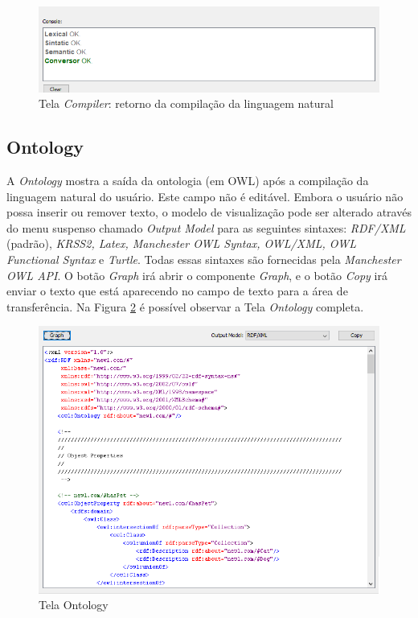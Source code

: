 \documentclass{bcc}
\begin{document}
\begin{figure}[H]
\centering
\includegraphics[width=.7\textwidth]{Figuras/tela_compiler2.png}
\caption{Tela \textit{Compiler}: retorno da compilação da linguagem natural}
\label{fig:telaCompiler2}
\end{figure}

\subsection{Ontology}

A \textit{Ontology} mostra a saída da ontologia (em OWL) após a compilação da linguagem natural do usuário. Este campo não é editável. Embora o usuário não possa inserir ou remover texto, o modelo de visualização pode ser alterado através do menu suspenso chamado \textit{Output Model} para as seguintes sintaxes: \textit{RDF/XML} (padrão), \textit{KRSS2, Latex, Manchester OWL Syntax, OWL/XML, OWL Functional Syntax} e \textit{Turtle}. Todas essas sintaxes são fornecidas pela \textit{Manchester OWL API}. O botão \textit{Graph} irá abrir o componente \textit{Graph}, e o botão \textit{Copy} irá enviar o texto que está aparecendo no campo de texto para a área de transferência. Na Figura \ref{fig:telaOntology} é possível observar a Tela \textit{Ontology} completa.

\begin{figure}[H]
\centering
\includegraphics[width=.7\textwidth]{Figuras/tela_ontology.png}
\caption{Tela Ontology}
\label{fig:telaOntology}
\end{figure}
\end{document}
